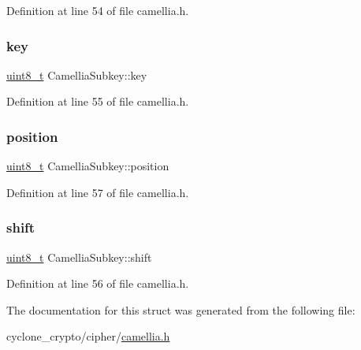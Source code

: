 Definition at line 54 of file camellia.\+h.

\mbox{\label{structCamelliaSubkey_a9d4ee77359241e8eada1a3fff35551ce}} 
\subsubsection{\texorpdfstring{key}{key}}
{\footnotesize\ttfamily \hyperlink{stdint_8h_aba7bc1797add20fe3efdf37ced1182c5}{uint8\+\_\+t} Camellia\+Subkey\+::key}



Definition at line 55 of file camellia.\+h.

\mbox{\label{structCamelliaSubkey_a851bbb32cfc2269202af66ef72aa897d}} 
\subsubsection{\texorpdfstring{position}{position}}
{\footnotesize\ttfamily \hyperlink{stdint_8h_aba7bc1797add20fe3efdf37ced1182c5}{uint8\+\_\+t} Camellia\+Subkey\+::position}



Definition at line 57 of file camellia.\+h.

\mbox{\label{structCamelliaSubkey_af62ef58a7800c83d492f05b8f1c04af0}} 
\subsubsection{\texorpdfstring{shift}{shift}}
{\footnotesize\ttfamily \hyperlink{stdint_8h_aba7bc1797add20fe3efdf37ced1182c5}{uint8\+\_\+t} Camellia\+Subkey\+::shift}



Definition at line 56 of file camellia.\+h.



The documentation for this struct was generated from the following file\+:\begin{DoxyCompactItemize}
\item 
cyclone\+\_\+crypto/cipher/\hyperlink{camellia_8h}{camellia.\+h}\end{DoxyCompactItemize}
